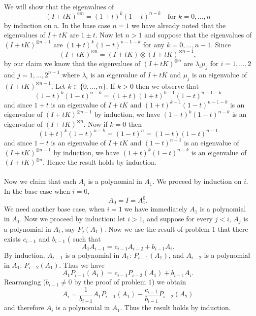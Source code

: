 \documentclass[letterpaper,12pt,oneside,onecolumn]{article}
\newcommand{\1}{\mathbbm{1}}
\begin{document}
\paragraph{}
We will show that the eigenvalues of
$$(I + tK)^{\otimes n} = (1+t)^k(1-t)^{n-k} \quad\text{for $k = 0,\dots, n$}$$
by induction on $n$. In the base case $n=1$ we have already noted that the eigenvalues of $I+tK$ are $1 \pm t$. Now let $n > 1$ and suppose that the eigenvalues of $(I+tK)^{\otimes n-1}$ are $(1+t)^k(1-t)^{n-1-k}$ for any $k =0, \dots, n-1$. Since
$$(I + tK)^{\otimes n} = (I+tK) \otimes (I+tK)^{\otimes n-1},$$
by our claim we know that the eigenvalues of $(I+tK)^{\otimes n}$ are $\lambda_i \mu_j$ for $i = 1, \dots, 2$ and $j = 1,\dots, 2^{n-1}$ where $\lambda_i$ is an eigenvalue of $I+tK$ and $\mu_j$ is an eigenvalue of $(I+tK)^{\otimes n-1}$. Let $k \in \{ 0, \dots, n\}$. If $k >0$ then we observe that
$$(1+t)^k(1-t)^{n-k} = (1+t)(1+t)^{k-1}(1-t)^{n-1-k}$$
and since $1+t$ is an eigenvalue of $I+tK$ and $(1+t)^{k-1}(1-t)^{n-1-k}$ is an eigenvalue of $(I+tK)^{\otimes n-1}$ by induction, we have $(1+t)^k(1-t)^{n-k}$ is an eigenvalue of $(I+tK)^{\otimes n}$. Now if $k = 0$ then
$$(1+t)^k(1-t)^{n-k} = (1-t)^{n} = (1-t)(1-t)^{n-1}$$
and since $1-t$ is an eigenvalue of $I+tK$ and $(1-t)^{n-1}$ is an eigenvalue of $(I+tK)^{\otimes n-1}$ by induction, we have $(1+t)^k(1-t)^{n-k}$ is an eigenvalue of $(I+tK)^{\otimes n}$. Hence the result holds by induction.
\paragraph{}
Now we claim that each $A_i$ is a polynomial in $A_1$. We proceed by induction on $i$. In the base case when $i=0$,
$$A_0 = I = A_1^0.$$
We need another base case, when $i=1$ we have immediately $A_1$ is a polynomial in $A_1$.
Now we proceed by induction: let $i > 1$, and suppose for every $j < i$, $A_j$ is a polynomial in $A_1$, say $P_j(A_1)$. Now we use the result of problem $1$ that there exists $c_{i-1}$ and $b_{i-1}$ ( such that
$$A_1A_{i-1} = c_{i-1}A_{i-2} + b_{i-1}A_i.$$
By induction, $A_{i-1}$ is a polynomial in $A_1$: $P_{i-1}(A_1)$, and $A_{i-2}$ is a polynomial in $A_1$: $P_{i-2}(A_1)$. Thus we have
$$A_1P_{i-1}(A_1) = c_{i-1}P_{i-2}(A_1) + b_{i-1}A_i.$$
Rearranging ($b_{i-1} \neq 0$ by the proof of problem $1$) we obtain
$$A_i = \frac{1}{b_{i-1}}A_1P_{i-1}(A_1) - \frac{c_{i-1}}{b_{i-1}}P_{i-2}(A_2)$$
and therefore $A_i$ is a polynomial in $A_1$. Thus the result holds by induction. 
\paragraph{}
\end{document}
